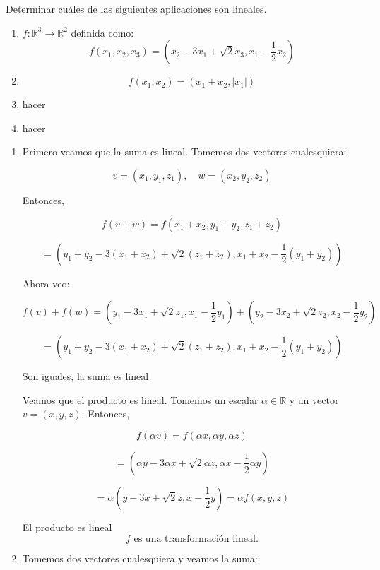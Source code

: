 \begin{enunciado}{\ejercicio}
  Determinar cuáles de las siguientes aplicaciones son lineales.
  \begin{enumerate}[label=(\alph*)]
  \item $f: \mathbb{R}^3 \to \mathbb{R}^2$ definida como:   \[
    f(x_1, x_2, x_3) = (x_2 - 3x_1 + \sqrt{2}x_3, x_1 - \frac{1}{2} x_2)
    \]
  \item \[f(x_1, x_2) = (x_1 + x_2, |x_1|)\]

  \item hacer
  \item hacer

  \end{enumerate}
\end{enunciado}

\begin{enumerate}[label=(\alph*)]
  \item
  Primero veamos que la suma es lineal. Tomemos dos vectores cualesquiera: 
  
  \[
  v = (x_1, y_1, z_1), \quad w = (x_2, y_2, z_2)
  \]
  
  Entonces,
  
  \[
  f(v + w) = f(x_1 + x_2, y_1 + y_2, z_1 + z_2)
  \]
  
  \[
  = (y_1 + y_2 - 3(x_1 + x_2) + \sqrt{2} (z_1 + z_2), x_1 + x_2 - \frac{1}{2} (y_1 + y_2))
  \]
  
  Ahora veo:
  
  \[
  f(v) + f(w) = (y_1 - 3x_1 + \sqrt{2} z_1, x_1 - \frac{1}{2} y_1) + (y_2 - 3x_2 + \sqrt{2} z_2, x_2 - \frac{1}{2} y_2)
  \]
  
  \[
  = (y_1 + y_2 - 3(x_1 + x_2) + \sqrt{2} (z_1 + z_2), x_1 + x_2 - \frac{1}{2} (y_1 + y_2))
  \]
  
  Son iguales, la suma es lineal
  
  Veamos que el producto es lineal. Tomemos un escalar $\alpha \in \mathbb{R}$ y un vector $v = (x, y, z)$. Entonces,
  
  \[
  f(\alpha v) = f(\alpha x, \alpha y, \alpha z)
  \]
  
  \[
  = (\alpha y - 3\alpha x + \sqrt{2} \alpha z, \alpha x - \frac{1}{2} \alpha y)
  \]
  
  \[
  = \alpha (y - 3x + \sqrt{2}z, x - \frac{1}{2} y) = \alpha f(x, y, z)
  \]
  
  El producto es lineal
  \[
  f \text{ es una transformación lineal.}
  \]
  \newpage
  \item 
  Tomemos dos vectores cualesquiera y veamos la suma: 


\end{enumerate}
